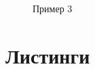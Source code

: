 \documentclass[14pt, a4paper]{extarticle}
\begin{document}
	\begin{figure}[h!]
		\centering\caption{Пример 3}
	\end{figure}

	\clearpage
	\section*{Листинги}
	
\end{document}
